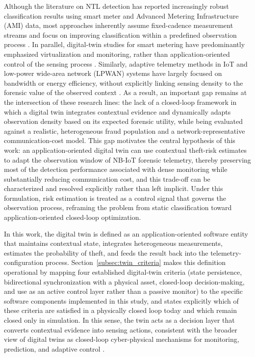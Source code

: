 \documentclass{ieeeaccess}
\begin{document}
Although the literature on NTL detection has reported increasingly robust classification results using smart meter and Advanced Metering Infrastructure (AMI) data, most approaches inherently assume fixed-cadence measurement streams and focus on improving classification within a predefined observation process \cite{b2,b4,b5,b6}. In parallel, digital-twin studies for smart metering have predominantly emphasized virtualization and monitoring, rather than application-oriented control of the sensing process \cite{b19,b20,b22}. Similarly, adaptive telemetry methods in IoT and low-power wide-area network (LPWAN) systems have largely focused on bandwidth or energy efficiency, without explicitly linking sensing density to the forensic value of the observed context \cite{b26,b27,b29}. As a result, an important gap remains at the intersection of these research lines: the lack of a closed-loop framework in which a digital twin integrates contextual evidence and dynamically adapts observation density based on its expected forensic utility, while being evaluated against a realistic, heterogeneous fraud population and a network-representative communication-cost model. This gap motivates the central hypothesis of this work: an application-oriented digital twin can use contextual theft-risk estimates to adapt the observation window of NB-IoT forensic telemetry, thereby preserving most of the detection performance associated with dense monitoring while substantially reducing communication cost, and this trade-off can be characterized and resolved explicitly rather than left implicit. Under this formulation, risk estimation is treated as a control signal that governs the observation process, reframing the problem from static classification toward application-oriented closed-loop optimization.

In this work, the digital twin is defined as an application-oriented software entity that maintains contextual state, integrates heterogeneous measurements, estimates the probability of theft, and feeds the result back into the telemetry-configuration process. Section~\ref{subsec:twin_criteria} makes this definition operational by mapping four established digital-twin criteria (state persistence, bidirectional synchronization with a physical asset, closed-loop decision-making, and use as an active control layer rather than a passive monitor) to the specific software components implemented in this study, and states explicitly which of these criteria are satisfied in a physically closed loop today and which remain closed only in simulation. In this sense, the twin acts as a decision layer that converts contextual evidence into sensing actions, consistent with the broader view of digital twins as closed-loop cyber-physical mechanisms for monitoring, prediction, and adaptive control \cite{b15,b16,b24}.
\end{document}
